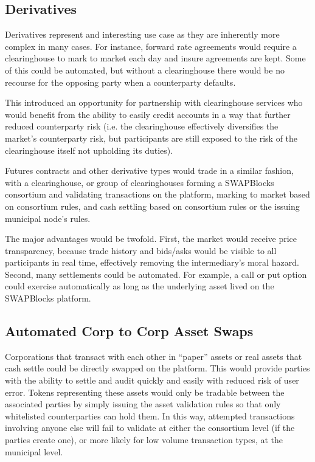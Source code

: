 \documentclass[12pt]{article}
\begin{document}
\subsection{Derivatives}
Derivatives represent and interesting use case as they are inherently more complex in many cases. For instance, 
forward rate agreements would require a clearinghouse to mark to market each day and insure agreements are kept. Some 
of this could be automated, but without a clearinghouse there would be no recourse for the opposing party when a 
counterparty defaults.


This introduced an opportunity for partnership with clearinghouse services who would benefit from the ability to easily 
credit accounts in a way that further reduced counterparty risk (i.e. the clearinghouse effectively diversifies the 
market’s counterparty risk, but participants are still exposed to the risk of the clearinghouse itself not 
upholding its duties).

Futures contracts and other derivative types would trade in a similar fashion, with a clearinghouse, or group of 
clearinghouses forming a SWAPBlocks consortium and validating transactions on the platform, marking to market based 
on consortium rules, and cash settling based on consortium rules or the issuing municipal node’s rules.

The major advantages would be twofold. First, the market would receive price transparency, because trade history 
and bids/asks would be visible to all participants in real time, effectively removing the intermediary’s moral 
hazard. Second, many settlements could be automated. For example, a call or put option could exercise automatically 
as long as the underlying asset lived on the SWAPBlocks platform.

\subsection{Automated Corp to Corp Asset Swaps}
Corporations that transact with each other in “paper” assets or real assets that cash settle could be directly 
swapped on the platform. This would provide parties with the ability to settle and audit quickly and easily with 
reduced risk of user error. Tokens representing these assets would only be tradable between the associated parties 
by simply issuing the asset validation rules so that only whitelisted counterparties can hold them. In this way, 
attempted transactions involving anyone else will fail to validate at either the consortium level (if the parties 
create one), or more likely for low volume transaction types, at the municipal level.
\end{document}
